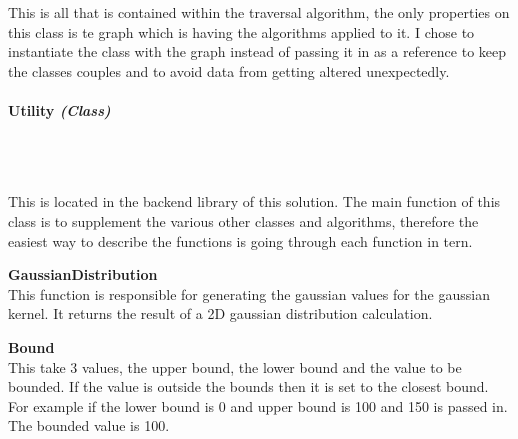 \begin{FlushLeft}
    This is all that is contained within the traversal algorithm, the only properties on this class is te graph which is having the algorithms applied to it. I chose to instantiate the class with the graph instead of passing it in as a reference to keep the classes couples and to avoid data from getting altered unexpectedly.
    \bk

    \pagebreak
\paragraph{Utility \textit{(Class)}} \mbox{} \\

    \begin{figure}[H]
        \centering
    \end{figure}\\

    This is located in the backend library of this solution. The main function of this class is to supplement the various other classes and algorithms, therefore the easiest way to describe the functions is going through each function in tern. \\ \bk

    \textbf{GaussianDistribution} \\ \bk
    This function is responsible for generating the gaussian values for the gaussian kernel. It returns the result of a 2D gaussian distribution calculation.\\\bk


    \textbf{Bound} \\ \bk
    This take 3 values, the upper bound, the lower bound and the value to be bounded. If the value is outside the bounds then it is set to the closest bound. For example if the lower bound is 0 and upper bound is 100 and 150 is passed in. The bounded value is 100.\\\bk


\end{FlushLeft}
